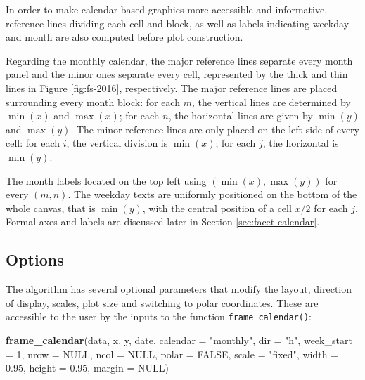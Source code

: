 \documentclass[12pt]{article}
\newenvironment{Shaded}{\begin{snugshade}}{\end{snugshade}}
\newcommand{\DataTypeTok}[1]{\textcolor[rgb]{0.13,0.29,0.53}{#1}}
\newcommand{\DecValTok}[1]{\textcolor[rgb]{0.00,0.00,0.81}{#1}}
\newcommand{\FloatTok}[1]{\textcolor[rgb]{0.00,0.00,0.81}{#1}}
\newcommand{\KeywordTok}[1]{\textcolor[rgb]{0.13,0.29,0.53}{\textbf{#1}}}
\newcommand{\NormalTok}[1]{#1}
\newcommand{\OtherTok}[1]{\textcolor[rgb]{0.56,0.35,0.01}{#1}}
\newcommand{\StringTok}[1]{\textcolor[rgb]{0.31,0.60,0.02}{#1}}
\begin{document}
In order to make calendar-based graphics more accessible and informative, reference lines dividing each cell and block, as well as labels indicating weekday and month are also computed before plot construction.

Regarding the monthly calendar, the major reference lines separate every month panel and the minor ones separate every cell, represented by the thick and thin lines in Figure \ref{fig:fs-2016}, respectively. The major reference lines are placed surrounding every month block: for each \(m\), the vertical lines are determined by \(\min{(x)}\) and \(\max{(x)}\); for each \(n\), the horizontal lines are given by \(\min{(y)}\) and \(\max{(y)}\). The minor reference lines are only placed on the left side of every cell: for each \(i\), the vertical division is \(\min{(x)}\); for each \(j\), the horizontal is \(\min{(y)}\).

The month labels located on the top left using \((\min{(x)}, \max{(y)})\) for every \((m, n)\). The weekday texts are uniformly positioned on the bottom of the whole canvas, that is \(\min{(y)}\), with the central position of a cell \(x / 2\) for each \(j\). Formal axes and labels are discussed later in Section \ref{sec:facet-calendar}.

\hypertarget{sec:opt}{%
\subsection{Options}\label{sec:opt}}

The algorithm has several optional parameters that modify the layout, direction of display, scales, plot size and switching to polar coordinates. These are accessible to the user by the inputs to the function \texttt{frame\_calendar()}:

\begin{Shaded}
\begin{Highlighting}[]
\KeywordTok{frame_calendar}\NormalTok{(data, x, y, date, }\DataTypeTok{calendar =} \StringTok{"monthly"}\NormalTok{, }\DataTypeTok{dir =} \StringTok{"h"}\NormalTok{,}
  \DataTypeTok{week_start =} \DecValTok{1}\NormalTok{, }\DataTypeTok{nrow =} \OtherTok{NULL}\NormalTok{, }\DataTypeTok{ncol =} \OtherTok{NULL}\NormalTok{, }\DataTypeTok{polar =} \OtherTok{FALSE}\NormalTok{, }\DataTypeTok{scale =} \StringTok{"fixed"}\NormalTok{,}
  \DataTypeTok{width =} \FloatTok{0.95}\NormalTok{, }\DataTypeTok{height =} \FloatTok{0.95}\NormalTok{, }\DataTypeTok{margin =} \OtherTok{NULL}\NormalTok{)}
\end{Highlighting}
\end{Shaded}
\end{document}
